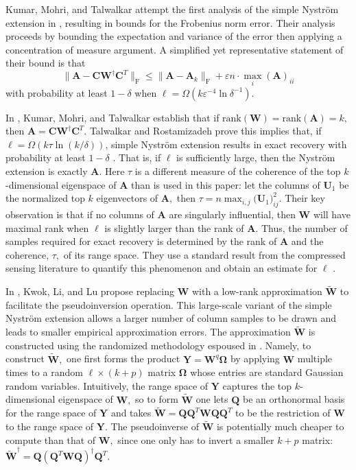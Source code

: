 \documentclass[11pt,letterpaper,twoside,reqno,nosumlimits]{amsart}
\def\pinv{\dagger}
\def\transp{T}
\newcommand{\mat}[1]{\ensuremath{\mathbf{#1}}}
\newcommand{\fnorm}[1]{\ensuremath{\big\|#1\big\|_{\mathrm{F}}}}
\theoremstyle{remark}
\begin{document}
Kumar, Mohri, and Talwalkar attempt the first analysis of the simple Nystr\"om extension in \cite{KMT09}, resulting in bounds for the Frobenius norm error. Their analysis proceeds by bounding the expectation and variance of the error then applying a concentration of measure argument. A simplified yet representative statement of their bound is that 
\[
 \fnorm{\mat{A} - \mat{C}\mat{W}^\pinv\mat{C}^\transp} \leq \fnorm{\mat{A} - \mat{A}_k} + \varepsilon n \cdot \max_i {(\mat{A})_{ii}}
\]
with probability at least $1-\delta$ when $\ell = \Omega(k \varepsilon^{-4}\ln \delta^{-1}).$ 

In \cite{KMT09a}, Kumar, Mohri, and Talwalkar establish that if $\text{rank}(\mat{W})= \text{rank}(\mat{A}) = k,$ then $\mat{A} = \mat{C}\mat{W}^\pinv \mat{C}^\transp.$ Talwalkar and Rostamizadeh prove this implies that, if $\ell = \Omega(k \tau \ln(k/\delta))$, simple Nystr\"om extension results in exact recovery with probability at least $1-\delta$ \cite{TR10}. That is, if $\ell$ is sufficiently large, then the Nystr\"om extension is exactly $\mat{A}.$ Here $\tau$ is a different measure of the coherence of the top $k$-dimensional eigenspace of $\mat{A}$ than is used in this paper: let the columns of $\mat{U}_1$ be the normalized top $k$ eigenvectors of $\mat{A},$ then $ \tau = n \max_{i,j} \big(\mat{U}_1\big)_{ij}^2.$ Their key observation is that if no columns of $\mat{A}$ are singularly influential, then $\mat{W}$ will have maximal rank when $\ell$ is slightly larger than the rank of $\mat{A}$. Thus, the number of samples required for exact recovery is determined by the rank of $\mat{A}$ and the 
coherence, $\tau,$ of its range space. They use a standard result from the compressed sensing literature to quantify this phenomenon and obtain an estimate for $\ell$ \cite{CR07}.

  In \cite{KLL10}, Kwok, Li, and Lu propose replacing $\mat{W}$ with a low-rank approximation $\tilde{\mat{W}}$ to facilitate the pseudoinversion operation. This large-scale variant of the simple Nystr\"om extension allows a larger number of column samples to be drawn and leads to smaller empirical approximation errors. The approximation $\tilde{\mat{W}}$ is constructed using the randomized methodology espoused in \cite{HMT11}. Namely, to construct $\tilde{\mat{W}},$ one first forms the product $\mat{Y} = \mat{W}^{q} \mat{\Omega}$ by applying $\mat{W}$ multiple times to a random $\ell \times (k+p)$ matrix $\mat{\Omega}$ whose entries are standard Gaussian random variables. Intuitively, the range space of $\mat{Y}$ captures the top $k$-dimensional eigenspace of $\mat{W},$ so to form $\tilde{\mat{W}}$ one lets $\mat{Q}$ be an orthonormal basis for the range space of $\mat{Y}$ and takes $\tilde{\mat{W}} = \mat{Q}\mat{Q}^\transp \mat{W} \mat{Q}\mat{Q}^\transp$ to be the restriction of $\mat{W}$ to the range 
space of $\mat{Y}.$ The pseudoinverse of $\tilde{\mat{W}}$ is potentially much cheaper to compute than that of $\mat{W},$ since one only has to invert a smaller $k+p$ matrix: $\tilde{\mat{W}}^\pinv = \mat{Q} (\mat{Q}^\transp \mat{W} \mat{Q})^\pinv \mat{Q}^\transp.$  
\end{document}
